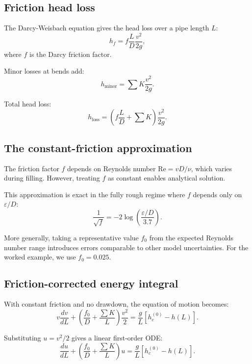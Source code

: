 \documentclass[11pt]{article}
\begin{document}
\subsection{Friction head loss}

The Darcy-Weisbach equation gives the head loss over a pipe length $L$:
\begin{equation}
  h_f = f \frac{L}{D} \frac{v^2}{2g},
  \label{eq:darcy-weisbach}
\end{equation}
where $f$ is the Darcy friction factor.

Minor losses at bends add:
\begin{equation}
  h_{\text{minor}} = \sum K \frac{v^2}{2g}.
  \label{eq:minor-loss}
\end{equation}

Total head loss:
\begin{equation}
  h_{\text{loss}} = \left(f\frac{L}{D} + \sum K\right) \frac{v^2}{2g}.
  \label{eq:total-loss}
\end{equation}

\subsection{The constant-friction approximation}

The friction factor $f$ depends on Reynolds number $\text{Re} = vD/\nu$, which varies during filling. However, treating $f$ as constant enables analytical solution.

This approximation is exact in the fully rough regime where $f$ depends only on $\varepsilon/D$:
\begin{equation}
  \frac{1}{\sqrt{f}} = -2\log\left(\frac{\varepsilon/D}{3.7}\right).
  \label{eq:fully-rough}
\end{equation}

More generally, taking a representative value $f_0$ from the expected Reynolds number range introduces errors comparable to other model uncertainties. For the worked example, we use $f_0 = 0.025$.

\subsection{Friction-corrected energy integral}

With constant friction and no drawdown, the equation of motion becomes:
\[
  v \frac{dv}{dL} + \left(\frac{f_0}{D} + \frac{\sum K}{L}\right) \frac{v^2}{2} = \frac{g}{L}[h_c^{(0)} - h(L)].
\]

Substituting $u = v^2/2$ gives a linear first-order ODE:
\begin{equation}
  \frac{du}{dL} + \left(\frac{f_0}{D} + \frac{\sum K}{L}\right) u = \frac{g}{L}[h_c^{(0)} - h(L)].
  \label{eq:u-ODE}
\end{equation}
\end{document}
